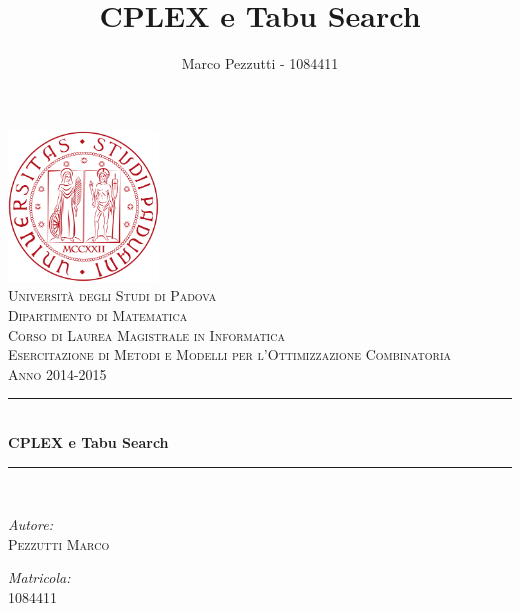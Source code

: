 \documentclass[11pt,a4paper,final]{article}
\author{Marco Pezzutti - 1084411}
\title{CPLEX e Tabu Search}
\date{}
\begin{document}
\begin{titlepage}
\begin{center}
\includegraphics[width=40mm]{immagini/Logo_Padova.png}\\[1cm]
\textcolor{redUni}{\textsc{\LARGE Università degli Studi di Padova}}\\[0.5cm]
\textcolor{redUni}{\textsc{\Large Dipartimento di Matematica}}\\[0.5cm]
\textcolor{redUni}{\textsc{\Large Corso di Laurea Magistrale in Informatica}}\\[2cm]
\textsc{\Large Esercitazione di Metodi e Modelli per l'Ottimizzazione Combinatoria}\\[0.5cm]
\textsc{\large Anno 2014-2015} \\[1cm]
\rule{\linewidth}{0.3mm}\\[0.5cm]
{\huge \bfseries CPLEX e Tabu Search}\\[0.3cm]
\rule{\linewidth}{0.3mm}\\[1cm]
\begin{minipage}{0.4\textwidth}
	\begin{flushleft}
	\emph{Autore:}\\
	\textsc{\large Pezzutti Marco}\\
	\end{flushleft}
\end{minipage}
\begin{minipage}{0.4\textwidth}
	\begin{flushright}
	\emph{Matricola:}\\
	\textsc{\large 1084411}\\
	\end{flushright}
\end{minipage}
\end{center}
\end{titlepage}

\tableofcontents
\listoffigures
\listoftables
\newpage







\appendix

\end{document}
